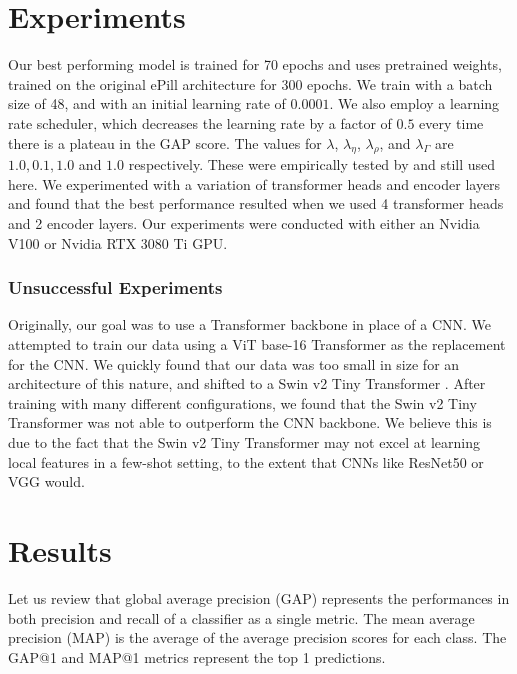 \documentclass[10pt,twocolumn,letterpaper]{article}
\begin{document}
\section{Experiments}

    
Our best performing model is trained for 70 epochs and uses pretrained weights, trained on the original ePill architecture for 300 epochs. We train with a batch size of 48, 
and with an initial learning rate of $0.0001$. We also employ a learning rate scheduler, which decreases the learning rate by a factor of $0.5$ 
every time there is a plateau in the GAP score. The values for $\lambda$, $\lambda_\eta$, $\lambda_\rho$, and $\lambda_\Gamma$ are $1.0,0.1,1.0$ and $1.0$ 
respectively. These were empirically tested by \cite{ePill} and still used here. We experimented with a variation of transformer heads and encoder layers and found that the best
performance resulted when we used 4 transformer heads and 2 encoder layers.
Our experiments were conducted with either an Nvidia V100 or Nvidia RTX 3080 Ti GPU.

\subsubsection{Unsuccessful Experiments}\label{sec:failed}
Originally, our goal was to use a Transformer backbone in place of a CNN. We attempted to train our data using a ViT base-16 Transformer \cite{an_imageworth} 
as the replacement for the CNN. We quickly found that our data was too small in size for an architecture of this nature, and shifted to a Swin v2 Tiny Transformer 
\cite{swinv2}. After training with many different configurations, we found that the Swin v2 Tiny Transformer was not able to outperform the CNN backbone. We believe 
this is due to the fact that the Swin v2 Tiny Transformer may not excel at learning local features in a few-shot setting, to the extent that CNNs like ResNet50
or VGG would. 


\section{Results}

Let us review that global average precision (GAP) represents the performances in both precision and recall of a classifier as a single metric. The mean average precision 
(MAP) is the average of the average precision scores for each class. The GAP@1 and MAP@1 metrics represent the top 1 predictions. 
\\
\end{document}
